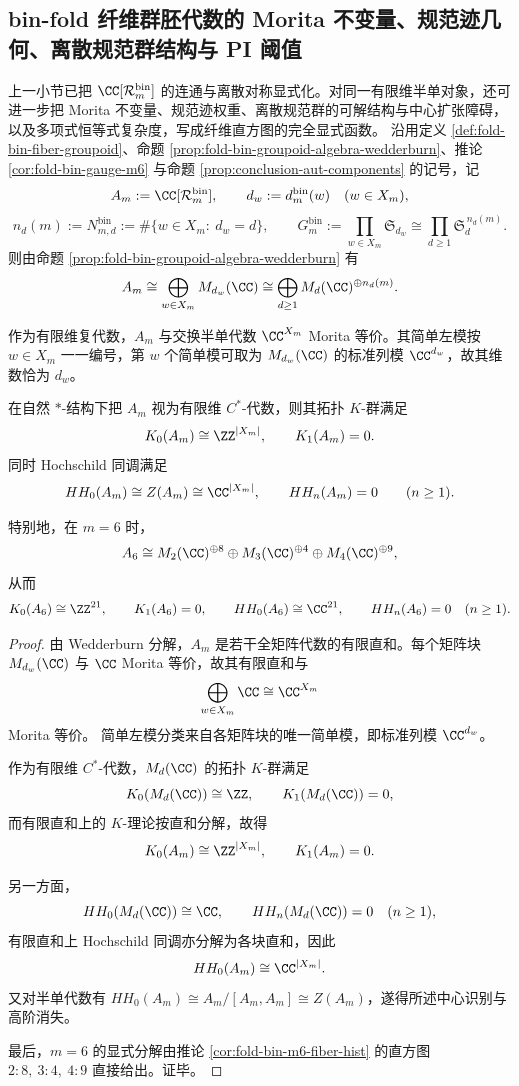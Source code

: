 \subsection{bin-fold 纤维群胚代数的 Morita 不变量、规范迹几何、离散规范群结构与 PI 阈值}\label{subsec:conclusion-foldbin-groupoid-morita-zeta-pi}
上一小节已把 \(\CC[\mathcal R_m^{\mathrm{bin}}]\) 的连通与离散对称显式化。对同一有限维半单对象，还可进一步把 Morita 不变量、规范迹权重、离散规范群的可解结构与中心扩张障碍，以及多项式恒等式复杂度，写成纤维直方图的完全显式函数。
沿用定义 \ref{def:fold-bin-fiber-groupoid}、命题 \ref{prop:fold-bin-groupoid-algebra-wedderburn}、推论 \ref{cor:fold-bin-gauge-m6} 与命题 \ref{prop:conclusion-aut-components} 的记号，记
\[
A_m:=\CC[\mathcal R_m^{\mathrm{bin}}],
\qquad
d_w:=d_m^{\mathrm{bin}}(w)\quad (w\in X_m),
\]
\[
n_d(m):=N_{m,d}^{\mathrm{bin}}:=\#\{w\in X_m:\ d_w=d\},
\qquad
G_m^{\mathrm{bin}}:=\prod_{w\in X_m}\mathfrak S_{d_w}
\cong
\prod_{d\ge 1}\mathfrak S_d^{\,n_d(m)}.
\]
则由命题 \ref{prop:fold-bin-groupoid-algebra-wedderburn} 有
\[
A_m
\cong
\bigoplus_{w\in X_m}M_{d_w}(\CC)
\cong
\bigoplus_{d\ge 1}M_d(\CC)^{\oplus n_d(m)}.
\]

\begin{theorem}\label{thm:conclusion-foldbin-groupoid-morita-k-hochschild}
作为有限维复代数，\(A_m\) 与交换半单代数 \(\CC^{X_m}\) Morita 等价。其简单左模按 \(w\in X_m\) 一一编号，第 \(w\) 个简单模可取为 \(M_{d_w}(\CC)\) 的标准列模 \(\CC^{d_w}\)，故其维数恰为 \(d_w\)。

在自然 \(\ast\)-结构下把 \(A_m\) 视为有限维 \(C^\ast\)-代数，则其拓扑 \(K\)-群满足
\[
K_0(A_m)\cong \ZZ^{|X_m|},
\qquad
K_1(A_m)=0.
\]
同时 Hochschild 同调满足
\[
HH_0(A_m)\cong Z(A_m)\cong \CC^{|X_m|},
\qquad
HH_n(A_m)=0\qquad (n\ge 1).
\]

特别地，在 \(m=6\) 时，
\[
A_6\cong M_2(\CC)^{\oplus 8}\oplus M_3(\CC)^{\oplus 4}\oplus M_4(\CC)^{\oplus 9},
\]
从而
\[
K_0(A_6)\cong \ZZ^{21},
\qquad
K_1(A_6)=0,
\qquad
HH_0(A_6)\cong \CC^{21},
\qquad
HH_n(A_6)=0\quad (n\ge 1).
\]
\end{theorem}
\begin{proof}
由 Wedderburn 分解，\(A_m\) 是若干全矩阵代数的有限直和。每个矩阵块 \(M_{d_w}(\CC)\) 与 \(\CC\) Morita 等价，故其有限直和与
\[
\bigoplus_{w\in X_m}\CC\cong \CC^{X_m}
\]
Morita 等价。
简单左模分类来自各矩阵块的唯一简单模，即标准列模 \(\CC^{d_w}\)。

作为有限维 \(C^\ast\)-代数，\(M_d(\CC)\) 的拓扑 \(K\)-群满足
\[
K_0(M_d(\CC))\cong \ZZ,
\qquad
K_1(M_d(\CC))=0,
\]
而有限直和上的 \(K\)-理论按直和分解，故得
\[
K_0(A_m)\cong \ZZ^{|X_m|},
\qquad
K_1(A_m)=0.
\]

另一方面，
\[
HH_0(M_d(\CC))\cong \CC,
\qquad
HH_n(M_d(\CC))=0\quad(n\ge 1),
\]
有限直和上 Hochschild 同调亦分解为各块直和，因此
\[
HH_0(A_m)\cong \CC^{|X_m|}.
\]
又对半单代数有 \(HH_0(A_m)\cong A_m/[A_m,A_m]\cong Z(A_m)\)，遂得所述中心识别与高阶消失。

最后，\(m=6\) 的显式分解由推论 \ref{cor:fold-bin-m6-fiber-hist} 的直方图 \(2:8,\ 3:4,\ 4:9\) 直接给出。证毕。
\end{proof}

